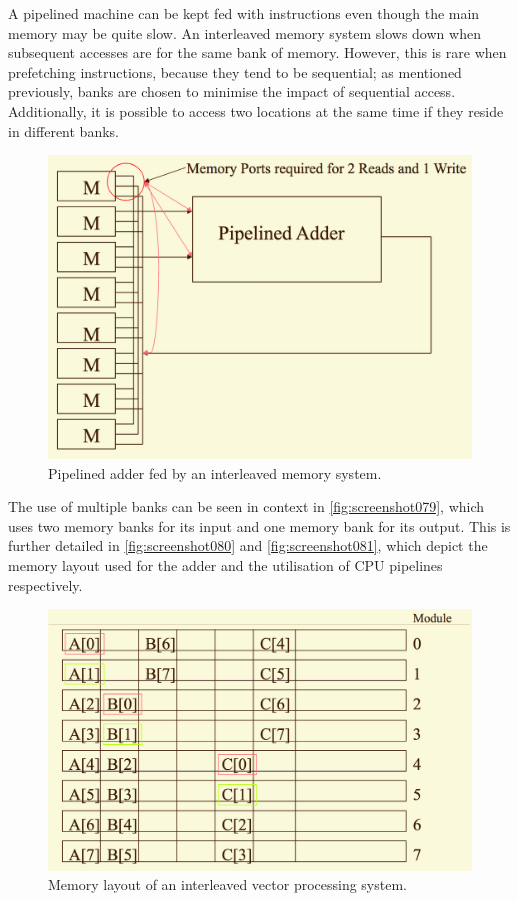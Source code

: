 A pipelined machine can be kept fed with instructions even though the main memory may be quite slow. An interleaved memory system slows down when subsequent accesses are for the same bank of memory. However, this is rare when prefetching instructions, because they tend to be sequential; as mentioned previously, banks are chosen to minimise the impact of sequential access. Additionally, it is possible to access two locations at the same time if they reside in different banks.  

\begin{figure}
\centering
\includegraphics[width=0.7\linewidth]{screenshot079}
\caption{Pipelined adder fed by an interleaved memory system.}
\label{fig:screenshot079}
\end{figure}

The use of multiple banks can be seen in context in \autoref{fig:screenshot079}, which uses two memory banks for its input and one memory bank for its output. This is further detailed in \autoref{fig:screenshot080} and \autoref{fig:screenshot081}, which depict the memory layout used for the adder and the utilisation of CPU pipelines respectively.

\begin{figure}
\centering
\includegraphics[width=0.7\linewidth]{screenshot080}
\caption{Memory layout of an interleaved vector processing system.}
\label{fig:screenshot080}
\end{figure}

